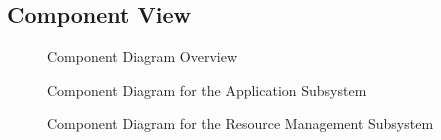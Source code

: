 \documentclass[english]{article}
\begin{document}
\subsection{Component View}

\begin{figure}[H]
	\centering
	\caption{Component Diagram Overview}
	\label{componentdiagram1}
\end{figure}
\begin{figure}[H]
	\centering
	\caption{Component Diagram for the Application Subsystem}
	\label{componentdiagram2}
\end{figure}
\begin{figure}[H]
	\centering
	\caption{Component Diagram for the Resource Management Subsystem}
	\label{componentdiagram3}
\end{figure}
\end{document}
